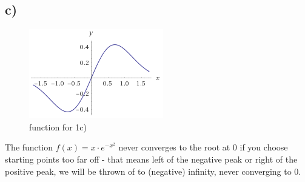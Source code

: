 \documentclass[12pt,a4paper]{scrartcl}
\begin{document}
	\subsection*{c)}
	\begin{figure}[!h]
		\centering
		\includegraphics[width = \textwidth]{AI1c.png}
		\caption{function for 1c)}
	\end{figure}
	The function $f(x) = x \cdot e^{-x^2}$ never converges to the root at 0 if you choose starting points too far off - that means left of the negative peak or right of the positive peak, we will be thrown of to (negative) infinity, never converging to 0.
\end{document}
